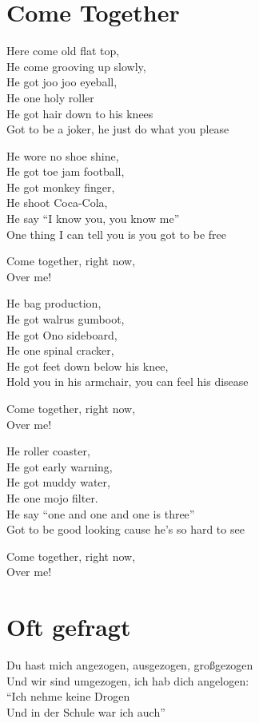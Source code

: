 \documentclass[]{book}
\begin{document}
\hypertarget{come-together-1}{%
\section{Come Together}\label{come-together-1}}

Here come old flat top,\\
He come grooving up slowly,\\
He got joo joo eyeball,\\
He one holy roller\\
He got hair down to his knees\\
Got to be a joker, he just do what you please

He wore no shoe shine,\\
He got toe jam football,\\
He got monkey finger,\\
He shoot Coca-Cola,\\
He say ``I know you, you know me''\\
One thing I can tell you is you got to be free

Come together, right now,\\
Over me!

He bag production,\\
He got walrus gumboot,\\
He got Ono sideboard,\\
He one spinal cracker,\\
He got feet down below his knee,\\
Hold you in his armchair, you can feel his disease

Come together, right now,\\
Over me!

He roller coaster,\\
He got early warning,\\
He got muddy water,\\
He one mojo filter.\\
He say ``one and one and one is three''\\
Got to be good looking cause he's so hard to see

Come together, right now,\\
Over me!

\hypertarget{oft-gefragt-2}{%
\section{Oft gefragt}\label{oft-gefragt-2}}

Du hast mich angezogen, ausgezogen, großgezogen\\
Und wir sind umgezogen, ich hab dich angelogen:\\
``Ich nehme keine Drogen\\
Und in der Schule war ich auch''
\end{document}
